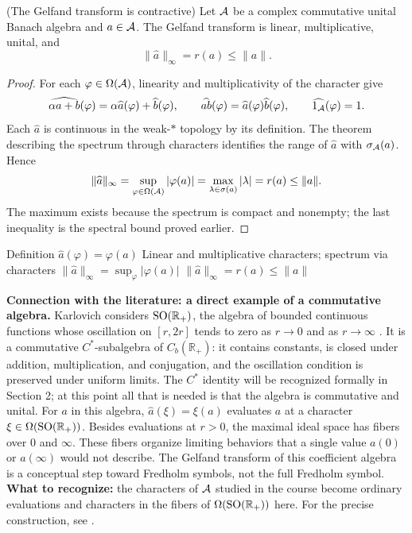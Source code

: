 \begin{cthproposicion}{(The Gelfand transform is contractive)}
Let $\mathcal A$ be a complex commutative unital Banach algebra and
$a\in\mathcal A$. The Gelfand transform is linear, multiplicative,
unital, and
\[
 \|\widehat a\|_\infty=r(a)\le\|a\|.
\]
\end{cthproposicion}

\begin{proof}[Proof]
For each $\varphi\in\Omega(\mathcal A)$, linearity and
multiplicativity of the character give
\[
 \widehat{\alpha a+b}(\varphi)
   =\alpha\widehat a(\varphi)+\widehat b(\varphi),\qquad
 \widehat{ab}(\varphi)=\widehat a(\varphi)\widehat b(\varphi),
 \qquad \widehat{1_\mathcal A}(\varphi)=1.
\]
Each $\widehat a$ is continuous in the weak-$*$ topology by its
definition. The theorem describing the spectrum through
characters identifies the range of $\widehat a$
with $\sigma_\mathcal A(a)$. Hence
\[
 \|\widehat a\|_\infty=\sup_{\varphi\in\Omega(\mathcal A)}|\varphi(a)|
 =\max_{\lambda\in\sigma(a)}|\lambda|=r(a)\le\|a\|.
\]
The maximum exists because the spectrum is compact and nonempty;
the last inequality is the spectral bound proved earlier.
\end{proof}

\proofdiagram
{Definition $\widehat a(\varphi)=\varphi(a)$}
{Linear and multiplicative characters; spectrum via characters}
{$\|\widehat a\|_\infty=\sup_{\varphi}|\varphi(a)|$}
{$\|\widehat a\|_\infty=r(a)\le\|a\|$}

\begin{investigacion}[unbreakable]
\textbf{Connection with the literature: a direct example of a commutative algebra.}
Karlovich considers $\operatorname{SO}(\mathbb R_+)$, the algebra of bounded continuous functions whose
oscillation on $[r,2r]$ tends to zero as $r\to0$ and as $r\to\infty$
\cite[pp.~465--466, §2]{Karlovich2017}. It is a commutative $C^*$-subalgebra of
$C_b(\mathbb R_+)$: it contains constants, is closed under addition, multiplication, and conjugation, and
the oscillation condition is preserved under uniform limits. The
$C^*$ identity will be recognized formally in Section 2; at this point all that is
needed is that the algebra is commutative and unital. For $a$ in this algebra,
$\widehat a(\xi)=\xi(a)$ evaluates $a$ at a character $\xi\in\Omega(\operatorname{SO}(\mathbb R_+))$.
Besides evaluations at $r>0$, the maximal ideal space has fibers over $0$ and
$\infty$. These fibers organize limiting behaviors that a single value $a(0)$ or
$a(\infty)$ would not describe. The Gelfand transform of this coefficient algebra
is a conceptual step toward Fredholm symbols, not the full Fredholm symbol.
\textbf{What to recognize:} the characters of $\mathcal A$ studied in the course
become ordinary evaluations and characters in the fibers of
$\Omega(\operatorname{SO}(\mathbb R_+))$ here. For the precise construction, see
\cite[§2, Propositions~2.1--2.2]{Karlovich2017}.
\end{investigacion}

